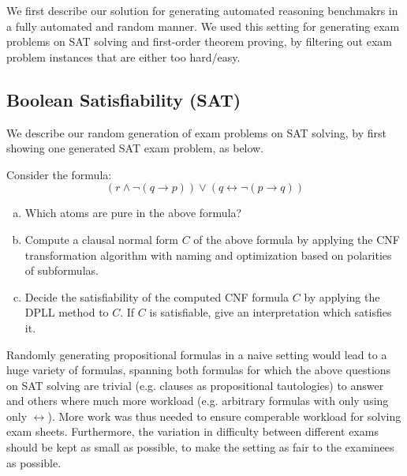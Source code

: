 We first describe our solution for generating automated reasoning
benchmakrs in a fully automated and random manner. We used this
setting for generating exam problems on SAT solving and first-order
theorem proving, by 
 filtering out exam problem instances that are either too hard/easy. 

 \subsection{Boolean Satisfiability (SAT)}\label{sec:sat}
We describe our random generation of exam problems on SAT solving, by
first 
showing  one generated SAT exam problem, as 
below.

\begin{mdframed}
    \begin{example}\label{ex:sat}
        Consider the formula:
        \[
            ( r \land \lnot ( q \rightarrow p ) ) \lor ( q \leftrightarrow \lnot ( p \rightarrow q ) )
        \]
        \begin{enumerate}[(a)]
            \item
                Which atoms are pure in the above formula?
            \item\label{subtask:sat-cnf}
                Compute a clausal normal form $C$ of the above formula by
                applying the CNF transformation algorithm with naming and
                optimization based on polarities of subformulas.
            \item
                Decide the satisfiability of the computed CNF formula $C$
                by applying the DPLL method to $C$. If $C$ is
                satisfiable, give an interpretation which
                satisfies it.
        \end{enumerate}
    \end{example}
\end{mdframed}

 
Randomly generating propositional formulas in a naive setting would lead
to a huge variety of formulas,
spanning both formulas for which the above questions on SAT solving
are trivial (e.g. clauses as propositional tautologies) to answer
and others where much more workload  (e.g. arbitrary formulas with
only using only $\leftrightarrow$). More work was thus needed to
ensure comperable workload for solving exam sheets. 
Furthermore,
the variation in difficulty between different exams should be kept as small as possible,
to make the setting as fair to the examinees as possible.

